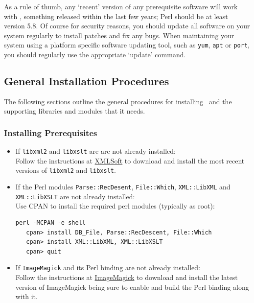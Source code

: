 \documentclass{article}
\begin{document}
As a rule of thumb, any `recent' version of any prerequisite software will
work with \LaTeXML, something released within the last few years;
Perl should be at least version 5.8.
Of course for security reasons, you should update all software on your system
regularly to install patches and fix any bugs.
When maintaining your system using a platform specific software
updating tool, such as \texttt{yum}, \texttt{apt} or \texttt{port},
you should regularly use the appropriate `update' command.

\subsection{General Installation Procedures}\label{install.general}
The following sections outline the general procedures for installing
\LaTeXML\ and the supporting libraries and modules that it needs.

\subsubsection{Installing Prerequisites}\label{install.prerequisites}
\begin{itemize}
\item If \texttt{libxml2} and \texttt{libxslt} are are not already installed:\\
  Follow the instructions at \href{http://www.xmlsoft.org}{XMLSoft} to
  download and install the most recent versions of \texttt{libxml2} and \texttt{libxslt}.
\item If the Perl modules \texttt{Parse::RecDesent}, \texttt{File::Which},
  \texttt{XML::LibXML} and  \texttt{XML::LibXSLT} are not already installed:\\
 Use CPAN to install the required perl modules (typically as root):
\begin{lstlisting}[style=shell]
   perl -MCPAN -e shell
   cpan> install DB_File, Parse::RecDescent, File::Which
   cpan> install XML::LibXML, XML::LibXSLT
   cpan> quit
\end{lstlisting}
\item If \texttt{ImageMagick} and its Perl binding are not already installed:\\
  Follow the instructions at \href{http://www.imagemagick.org/}{ImageMagick}
  to download and install the latest version of ImageMagick being sure to enable
  and build the Perl binding along with it.
\end{itemize}
\end{document}
